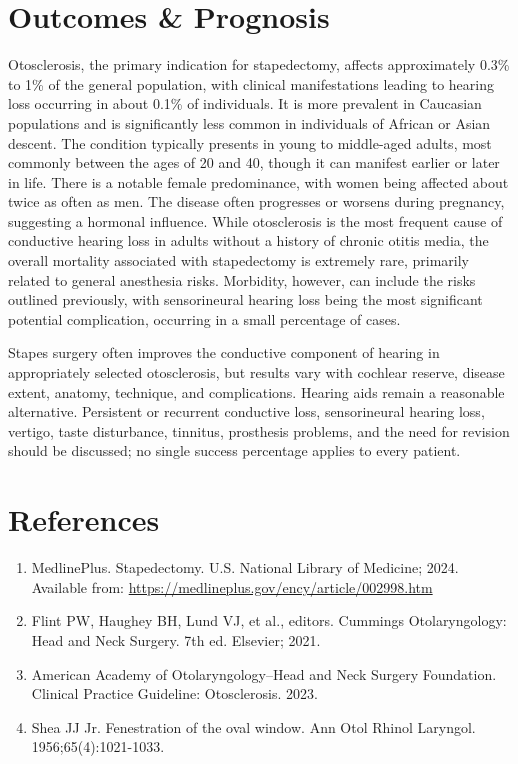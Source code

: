 \section*{Outcomes \& Prognosis}
Otosclerosis, the primary indication for stapedectomy, affects approximately 0.3\% to 1\% of the general population, with clinical manifestations leading to hearing loss occurring in about 0.1\% of individuals. It is more prevalent in Caucasian populations and is significantly less common in individuals of African or Asian descent. The condition typically presents in young to middle-aged adults, most commonly between the ages of 20 and 40, though it can manifest earlier or later in life. There is a notable female predominance, with women being affected about twice as often as men. The disease often progresses or worsens during pregnancy, suggesting a hormonal influence. While otosclerosis is the most frequent cause of conductive hearing loss in adults without a history of chronic otitis media, the overall mortality associated with stapedectomy is extremely rare, primarily related to general anesthesia risks. Morbidity, however, can include the risks outlined previously, with sensorineural hearing loss being the most significant potential complication, occurring in a small percentage of cases.

Stapes surgery often improves the conductive component of hearing in appropriately selected otosclerosis, but results vary with cochlear reserve, disease extent, anatomy, technique, and complications. Hearing aids remain a reasonable alternative. Persistent or recurrent conductive loss, sensorineural hearing loss, vertigo, taste disturbance, tinnitus, prosthesis problems, and the need for revision should be discussed; no single success percentage applies to every patient.

\section*{References}
\begin{enumerate}
  \item MedlinePlus. Stapedectomy. U.S. National Library of Medicine; 2024. Available from: \url{https://medlineplus.gov/ency/article/002998.htm}
  
  \item Flint PW, Haughey BH, Lund VJ, et al., editors. Cummings Otolaryngology: Head and Neck Surgery. 7th ed. Elsevier; 2021.
  
  \item American Academy of Otolaryngology--Head and Neck Surgery Foundation. Clinical Practice Guideline: Otosclerosis. 2023.
  
  \item Shea JJ Jr. Fenestration of the oval window. Ann Otol Rhinol Laryngol. 1956;65(4):1021-1033.
\end{enumerate}

\clearpage
